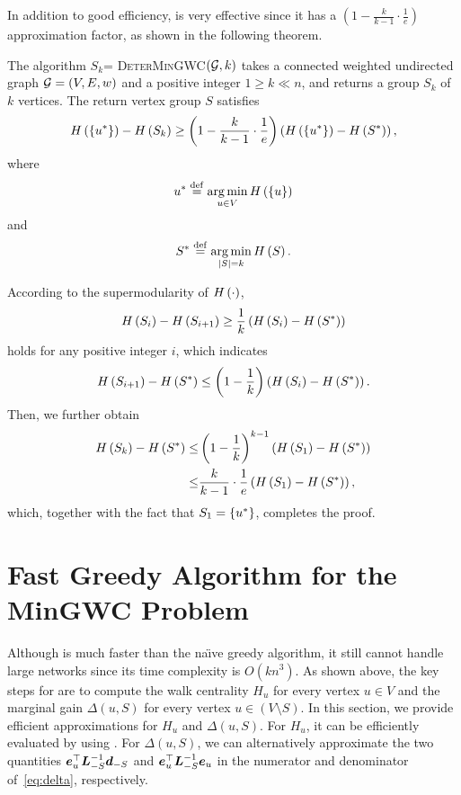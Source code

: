 \documentclass[10pt,twocolumn,twoside]{IEEEtran}
\begin{document}
In addition to good efficiency,  is very effective since it has a $(1-\frac{k}{k-1}\cdot\frac{1}{e})$ approximation factor, as shown in the following theorem.
\begin{theorem}
    The algorithm $S_k$= \textsc {DeterMinGWC}$ (\mathcal{G},k)$ takes a connected weighted undirected graph \(\mathcal{G}=(V,E,w)\) and a positive integer \(1 \geq k \ll n\), and returns a  group \(S_k\) of \(k\) vertices.
    The return vertex group \(S\) satisfies
    \[H\left(\left\{u^* \right\}\right)-H\left(S_k\right)\ge\left( 1-\frac{k}{k-1}\cdot\frac{1}{e} \right)\left( H\left(\left\{u^* \right\}\right)-H\left(S^*\right) \right),\]
    where
    \[u^*\stackrel{\mathrm{def}}{=}\operatorname*{arg\,min}_{u\in V}H\left(\left\{u \right\}\right)\] and \[S^*\stackrel{\mathrm{def}}{=}\operatorname*{arg\,min}_{\left|S \right|=k}H\left(S\right).\]
\end{theorem}
\begin{IEEEproof}
    According to the supermodularity of \(H\left(\cdot\right)\),
    \[H\left(S_i\right)-H\left(S_{i+1}\right)\ge\frac{1}{k}\left( H\left(S_i\right)-H\left(S^*\right) \right)\]
    holds for any positive integer \(i\), which indicates
    \[H\left(S_{i+1}\right)-H\left(S^*\right)\le\left( 1-\frac{1}{k} \right)\left( H\left(S_i\right)-H\left(S^*\right) \right).\]
    Then, we  further obtain
    \begin{align*}
        H\left(S_k\right)-H\left(S^*\right)\le & \left( 1-\frac{1}{k} \right)^{k-1}\left( H\left(S_1\right)-H\left(S^*\right) \right)    \\
        \le                      & \frac{k}{k-1}\cdot\frac{1}{e}\left( H\left(S_1\right)-H\left(S^*\right) \right),
    \end{align*}
    which, together with the fact that \(S_1=\left\{u^* \right\}\), completes the proof.
\end{IEEEproof}

\section{Fast Greedy Algorithm for the MinGWC Problem}\label{sec:approx-algo2}

Although  is much faster than the  na\"{\i}ve greedy  algorithm, it  still cannot handle  large networks since its time complexity is  \(O(kn^3)\). As shown above, the key steps for  are  to compute the walk centrality $H_u$ for every vertex $u \in V$ and the marginal gain  \(\Delta(u,S)\) for every vertex $u \in (V \setminus S)$. In this section, we provide efficient approximations for  $H_u$ and \(\Delta(u,S)\). For $H_u$, it can be efficiently evaluated by using . For \(\Delta(u,S)\), we can alternatively approximate the two quantities  $\boldsymbol{e}_u^\top \boldsymbol{L}_{-S}^{-1} \boldsymbol{d}_{-S}$ and $\boldsymbol{e}_u^\top \boldsymbol{L}_{-S}^{-1}\boldsymbol{e}_u$ in the numerator and denominator of~\eqref{eq:delta}, respectively.
\end{document}
